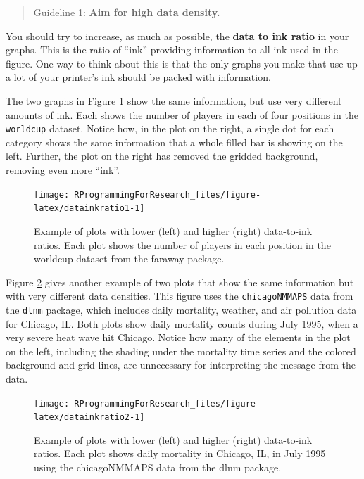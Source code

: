 \documentclass[]{book}
\theoremstyle{definition}
\theoremstyle{definition}
\theoremstyle{definition}
\theoremstyle{remark}
\begin{document}
\begin{quote}
Guideline 1: \textbf{Aim for high data density.}
\end{quote}

You should try to increase, as much as possible, the \textbf{data to ink
ratio} in your graphs. This is the ratio of ``ink'' providing
information to all ink used in the figure. One way to think about this
is that the only graphs you make that use up a lot of your printer's ink
should be packed with information.

The two graphs in Figure \ref{fig:datainkratio1} show the same
information, but use very different amounts of ink. Each shows the
number of players in each of four positions in the \texttt{worldcup}
dataset. Notice how, in the plot on the right, a single dot for each
category shows the same information that a whole filled bar is showing
on the left. Further, the plot on the right has removed the gridded
background, removing even more ``ink''.

\begin{figure}

{\centering \texttt{[image: RProgrammingForResearch\_files/figure-latex/datainkratio1-1]} 

}

\caption{Example of plots with lower (left) and higher (right) data-to-ink ratios. Each plot shows the number of players in each position in the worldcup dataset from the faraway package.}\label{fig:datainkratio1}
\end{figure}

Figure \ref{fig:datainkratio2} gives another example of two plots that
show the same information but with very different data densities. This
figure uses the \texttt{chicagoNMMAPS} data from the \texttt{dlnm}
package, which includes daily mortality, weather, and air pollution data
for Chicago, IL. Both plots show daily mortality counts during July
1995, when a very severe heat wave hit Chicago. Notice how many of the
elements in the plot on the left, including the shading under the
mortality time series and the colored background and grid lines, are
unnecessary for interpreting the message from the data.

\begin{figure}

{\centering \texttt{[image: RProgrammingForResearch\_files/figure-latex/datainkratio2-1]} 

}

\caption{Example of plots with lower (left) and higher (right) data-to-ink ratios. Each plot shows daily mortality in Chicago, IL, in July 1995 using the chicagoNMMAPS data from the dlnm package.}\label{fig:datainkratio2}
\end{figure}
\end{document}
